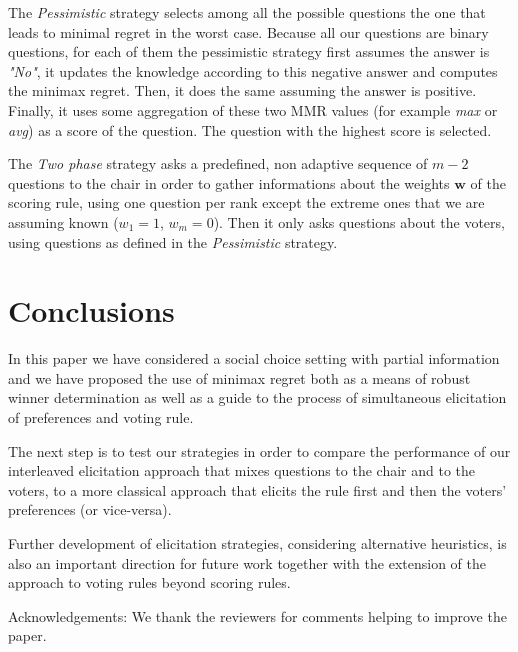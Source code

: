 \documentclass[a4paper,twoside]{article}
\newcommand{\w}{\bm{w}}
\newcommand{\strat}[1]{\emph{#1}}
\begin{document}
The \strat{Pessimistic} strategy selects among all the possible questions the one that leads to minimal regret in the worst case. Because all our questions are binary questions, for each of them the pessimistic strategy first assumes the answer is \emph{"No"}, it updates the knowledge according to this negative answer and computes the minimax regret. Then, it does the same assuming the answer is positive. Finally, it uses some aggregation of these two MMR values (for example \emph{max} or \emph{avg}) as a score of the question. The question with the highest score is selected.

The \strat{Two phase} strategy asks a predefined, non adaptive sequence of $m-2$ questions to the chair in order to gather informations about the weights $\w$ of the scoring rule, using one question per rank except the extreme ones that we are assuming known ($w_1=1$, $w_m=0$). Then it only asks questions about the voters, using questions as defined in the \strat{Pessimistic} strategy. 

\section{Conclusions}  
\label{sec:conclusions}
In this paper we have considered a social choice setting with partial information and we have proposed the use of minimax regret both as a means of robust winner determination as well as a guide to the process of simultaneous elicitation of preferences and voting rule.

The next step is to test our strategies in order to compare the performance of our interleaved elicitation approach that mixes questions to the chair and to the voters, to a more classical approach that elicits the rule first and then the voters' preferences (or vice-versa). 

Further development of elicitation strategies, considering alternative heuristics, is also an important direction for future work together with the extension of the approach to voting rules beyond scoring rules.
\bigskip

Acknowledgements: We thank the reviewers for comments helping to improve the paper. 


% 
\end{document}
